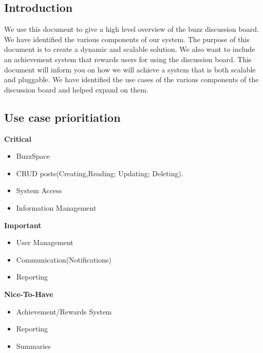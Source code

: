 \documentclass[a4paper,12pt]{report}
\begin{document}
\subsection{Introduction}
We use this document to give a high level overview of the buzz  discussion board. We have identified the various components of our system. The purpose of this document is to create a dynamic and scalable solution. We also want to include an achievement system that rewards users for using the discussion board. This document will inform you on how we will achieve a system that is both scalable and pluggable. We have identified the use cases of the various components of the discussion board and helped expand on them.
\newpage
\subsection{Use case prioritiation}
\textbf{Critical} 
\begin{itemize}
  \item BuzzSpace
  \item CRUD posts(Creating,Reading; Updating; Deleting).
  \item System Access
  \item Information Management
  \end{itemize}
\textbf{Important} 
\begin{itemize}
  \item User Management
  \item Communication(Notifications)
  \item Reporting
\end{itemize}
\textbf{Nice-To-Have} 
\begin{itemize}
  \item Achievement/Rewards System
  \item Reporting
  \item Summaries
\end{itemize}
\end{document}
